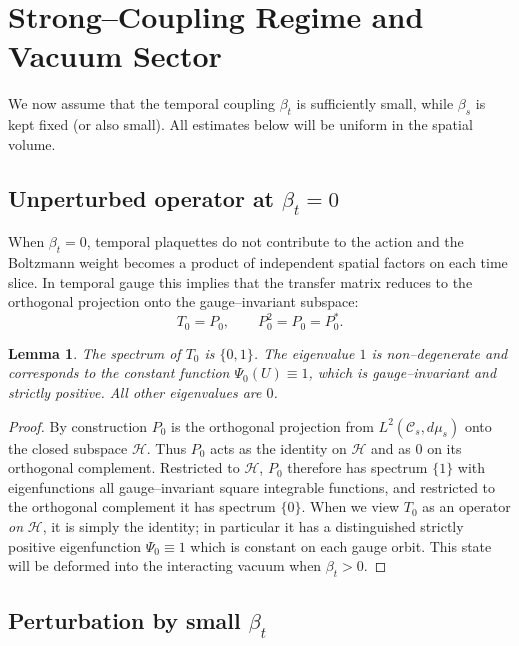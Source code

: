 \documentclass[11pt]{article}
\newtheorem{lemma}[theorem]{Lemma}
\begin{document}
\section{Strong--Coupling Regime and Vacuum Sector}

We now assume that the temporal coupling $\beta_t$ is sufficiently
small, while $\beta_s$ is kept fixed (or also small).  All estimates
below will be uniform in the spatial volume.

\subsection{Unperturbed operator at $\beta_t=0$}

When $\beta_t=0$, temporal plaquettes do not contribute to the action
and the Boltzmann weight becomes a product of independent spatial
factors on each time slice.  In temporal gauge this implies that the
transfer matrix reduces to the orthogonal projection onto the
gauge--invariant subspace:
\begin{equation}
  T_0 = P_0,\qquad P_0^2=P_0=P_0^*.
\end{equation}

\begin{lemma}
The spectrum of $T_0$ is $\{0,1\}$.  The eigenvalue $1$ is
non--degenerate and corresponds to the constant function
$\Psi_0(U)\equiv 1$, which is gauge--invariant and strictly positive.
All other eigenvalues are $0$.
\end{lemma}

\begin{proof}
By construction $P_0$ is the orthogonal projection from
$L^2(\mathcal{C}_s,d\mu_s)$ onto the closed subspace $\mathcal{H}$.
Thus $P_0$ acts as the identity on $\mathcal{H}$ and as $0$ on its
orthogonal complement.  Restricted to $\mathcal{H}$, $P_0$ therefore has
spectrum $\{1\}$ with eigenfunctions all gauge--invariant square
integrable functions, and restricted to the orthogonal complement it has
spectrum $\{0\}$.  When we view $T_0$ as an operator \emph{on}
$\mathcal{H}$, it is simply the identity; in particular it has a
distinguished strictly positive eigenfunction $\Psi_0\equiv 1$ which is
constant on each gauge orbit.  This state will be deformed into the
interacting vacuum when $\beta_t>0$.
\end{proof}

\subsection{Perturbation by small $\beta_t$}
\end{document}
